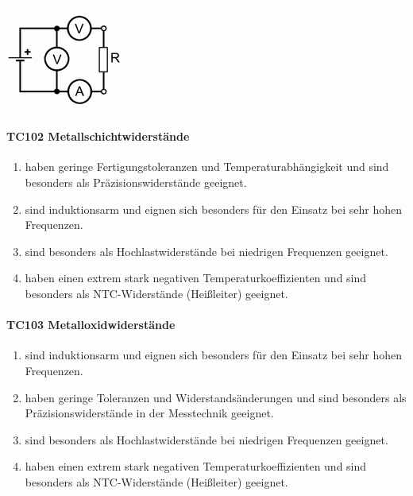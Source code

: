 \documentclass[8pt]{article}
\begin{document}
\begin{enumerate}
\begin{enumerate}[nolistsep,label=\Alph*]
\begin{enumerate}[nolistsep,label=\Alph*]
\begin{center}
		\begin{minipage}{\linewidth}
			\centering
			\includegraphics[scale=1.0]{pics/tc101_d.jpg}
		\end{minipage}
	\end{center}
\end{enumerate}

\paragraph*{TC102 Metallschichtwiderstände}
\begin{enumerate}[nolistsep,label=\Alph*]
\item haben geringe Fertigungstoleranzen und Temperaturabhängigkeit und sind besonders als Präzisionswiderstände geeignet.
\item sind induktionsarm und eignen sich besonders für den Einsatz bei sehr hohen Frequenzen. 
\item sind besonders als Hochlastwiderstände bei niedrigen Frequenzen geeignet.
\item haben einen extrem stark negativen Temperaturkoeffizienten und sind besonders als NTC-Widerstände (Heißleiter) geeignet.
\end{enumerate}

\paragraph*{TC103 Metalloxidwiderstände}
\begin{enumerate}[nolistsep,label=\Alph*]
\item sind induktionsarm und eignen sich besonders für den Einsatz bei sehr hohen Frequenzen.
\item haben geringe Toleranzen und Widerstandsänderungen und sind besonders als Präzisionswiderstände in der Messtechnik geeignet.
\item sind besonders als Hochlastwiderstände bei niedrigen Frequenzen geeignet.
\item haben einen extrem stark negativen Temperaturkoeffizienten und sind besonders als NTC-Widerstände (Heißleiter) geeignet.
\end{enumerate}


\end{enumerate}
\end{enumerate}
\end{document}
